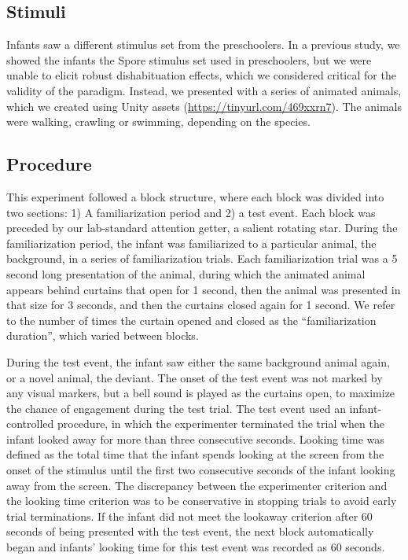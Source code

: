 \documentclass[10pt, letterpaper]{article}
\begin{document}
\hypertarget{stimuli-1}{%
\subsection{Stimuli}\label{stimuli-1}}

Infants saw a different stimulus set from the preschoolers. In a
previous study, we showed the infants the Spore stimulus set used in
preschoolers, but we were unable to elicit robust dishabituation
effects, which we considered critical for the validity of the paradigm.
Instead, we presented with a series of animated animals, which we
created using Unity assets (\url{https://tinyurl.com/469xxrn7}). The
animals were walking, crawling or swimming, depending on the species.

\hypertarget{procedure}{%
\subsection{Procedure}\label{procedure}}

This experiment followed a block structure, where each block was divided
into two sections: 1) A familiarization period and 2) a test event. Each
block was preceded by our lab-standard attention getter, a salient
rotating star. During the familiarization period, the infant was
familiarized to a particular animal, the background, in a series of
familiarization trials. Each familiarization trial was a 5 second long
presentation of the animal, during which the animated animal appears
behind curtains that open for 1 second, then the animal was presented in
that size for 3 seconds, and then the curtains closed again for 1
second. We refer to the number of times the curtain opened and closed as
the ``familiarization duration'', which varied between blocks.

During the test event, the infant saw either the same background animal
again, or a novel animal, the deviant. The onset of the test event was
not marked by any visual markers, but a bell sound is played as the
curtains open, to maximize the chance of engagement during the test
trial. The test event used an infant-controlled procedure, in which the
experimenter terminated the trial when the infant looked away for more
than three consecutive seconds. Looking time was defined as the total
time that the infant spends looking at the screen from the onset of the
stimulus until the first two consecutive seconds of the infant looking
away from the screen. The discrepancy between the experimenter criterion
and the looking time criterion was to be conservative in stopping trials
to avoid early trial terminations. If the infant did not meet the
lookaway criterion after 60 seconds of being presented with the test
event, the next block automatically began and infants' looking time for
this test event was recorded as 60 seconds.
\end{document}
